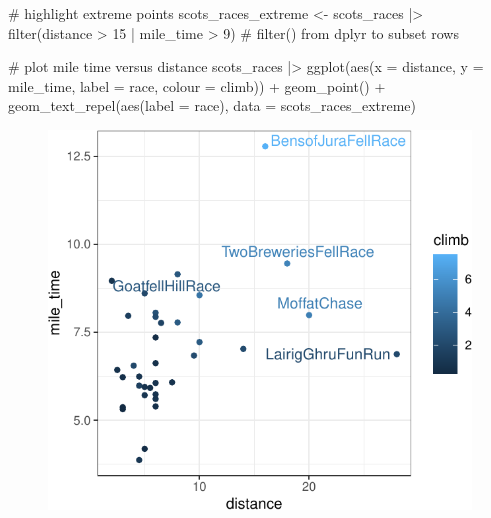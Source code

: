 \documentclass[
  11pt,
  letterpaper,
  oneside]{book}
\newenvironment{Shaded}{\begin{snugshade}}{\end{snugshade}}
\newcommand{\AttributeTok}[1]{\textcolor[rgb]{0.40,0.45,0.13}{#1}}
\newcommand{\CommentTok}[1]{\textcolor[rgb]{0.37,0.37,0.37}{#1}}
\newcommand{\DecValTok}[1]{\textcolor[rgb]{0.68,0.00,0.00}{#1}}
\newcommand{\FunctionTok}[1]{\textcolor[rgb]{0.28,0.35,0.67}{#1}}
\newcommand{\NormalTok}[1]{\textcolor[rgb]{0.00,0.23,0.31}{#1}}
\newcommand{\OtherTok}[1]{\textcolor[rgb]{0.00,0.23,0.31}{#1}}
\newcommand{\SpecialCharTok}[1]{\textcolor[rgb]{0.37,0.37,0.37}{#1}}
\theoremstyle{plain}
\theoremstyle{plain}
\theoremstyle{definition}
\theoremstyle{definition}
\theoremstyle{plain}
\theoremstyle{remark}
\begin{document}
\begin{Shaded}
\begin{Highlighting}[]
\CommentTok{\# highlight extreme points}
\NormalTok{scots\_races\_extreme }\OtherTok{\textless{}{-}}\NormalTok{ scots\_races }\SpecialCharTok{|\textgreater{}}
  \FunctionTok{filter}\NormalTok{(distance }\SpecialCharTok{\textgreater{}} \DecValTok{15} \SpecialCharTok{|}\NormalTok{ mile\_time }\SpecialCharTok{\textgreater{}} \DecValTok{9}\NormalTok{) }\CommentTok{\# filter() from dplyr to subset rows}

\CommentTok{\# plot mile time versus distance}
\NormalTok{scots\_races }\SpecialCharTok{|\textgreater{}}
  \FunctionTok{ggplot}\NormalTok{(}\FunctionTok{aes}\NormalTok{(}\AttributeTok{x =}\NormalTok{ distance, }\AttributeTok{y =}\NormalTok{ mile\_time, }\AttributeTok{label =}\NormalTok{ race, }\AttributeTok{colour =}\NormalTok{ climb)) }\SpecialCharTok{+}
  \FunctionTok{geom\_point}\NormalTok{() }\SpecialCharTok{+}
  \FunctionTok{geom\_text\_repel}\NormalTok{(}\FunctionTok{aes}\NormalTok{(}\AttributeTok{label =}\NormalTok{ race), }\AttributeTok{data =}\NormalTok{ scots\_races\_extreme)}
\end{Highlighting}
\end{Shaded}

\begin{figure}[H]

{\centering \includegraphics{r-demo-part-1_files/figure-pdf/unnamed-chunk-7-1.pdf}

}

\end{figure}
\end{document}
